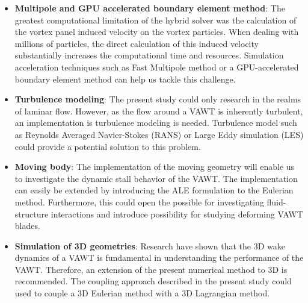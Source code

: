\begin{itemize}
\item \textbf{Multipole and GPU accelerated boundary element method}: The greatest computational limitation of the hybrid solver was the calculation of the vortex panel induced velocity on the vortex particles. When dealing with millions of particles, the direct calculation of this induced velocity substantially increases the computational time and resources. Simulation acceleration techniques such as Fast Multipole method or a GPU-accelerated boundary element method can help us tackle this challenge.

\item \textbf{Turbulence modeling}: The present study could only research in the realms of laminar flow. However, as the flow around a VAWT is inherently turbulent, an implementation is turbulence modeling is needed. Turbulence model such as Reynolds Averaged Navier-Stokes (RANS) or Large Eddy simulation (LES) could provide a potential solution to this problem.

\item \textbf{Moving body}: The implementation of the moving geometry will enable us to investigate the dynamic stall behavior of the VAWT. The implementation can easily be extended by introducing the ALE formulation to the Eulerian method. Furthermore, this could open the possible for investigating fluid-structure interactions and introduce possibility for studying deforming VAWT blades.

\item \textbf{Simulation of 3D geometries}: Research have shown that the 3D wake dynamics of a VAWT is fundamental in understanding the performance of the VAWT. Therefore, an extension of the present numerical method to 3D is recommended. The coupling approach described in the present study could used to couple a 3D Eulerian method with a 3D Lagrangian method.


\end{itemize}


